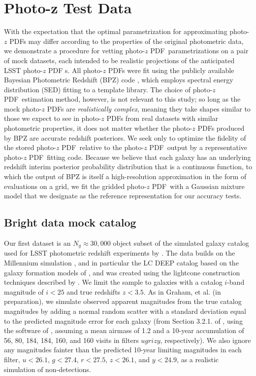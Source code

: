 \documentclass[\docopts]{\docclass}
\newcommand{\pz}{photo-$z$ PDF}
\newcommand{\Mgdata}{Bright\xspace}
\begin{document}
\section{Photo-z Test Data}
\label{sec:data}

With the expectation that the optimal parametrization for approximating \pz s 
may differ according to the properties of the original photometric data, we 
demonstrate a procedure for vetting \pz\ parametrizations on a pair of mock 
datasets, each intended to be realistic projections of the anticipated LSST \pz 
s.
All \pz s were fit using the publicly available Bayesian Photometric Redshift 
(BPZ) code \citep{benitez_bayesian_2000}, which employs spectral energy 
distribution (SED) fitting to a template library.
The choice of \pz\ estimation method, however, is not relevant to this study; 
so long as the mock \pz s are \textit{realistically complex}, meaning they take 
shapes similar to those we expect to see in \pz s from real datasets with 
similar photometric properties, it does not matter whether the \pz s produced 
by BPZ are accurate redshift posteriors.
We seek only to optimize the fidelity of the stored \pz\ relative to the \pz\ 
output by a representative \pz\ fitting code.
\citep[See][Schmidt, et al.\ in preparation for other work comparing the 
accuracy of \pz s produced by different methods.]{tanaka_photometric_2017}
Because we believe that each galaxy has an underlying redshift interim 
posterior probability distribution that is a continuous function, to which the 
output of BPZ is itself a high-resolution approximation in the form of 
evaluations on a grid, we fit the gridded \pz\ with a Gaussian mixture model 
that we designate as the reference representation for our accuracy tests.

\subsection{\Mgdata data mock catalog}
\label{sec:graham}

Our first dataset is an $N_{g}\approx30,000$ object subset of the simulated 
galaxy catalog used for LSST photometric redshift experiments by 
\citet{graham_photometric_2017}.
The data builds on the Millennium simulation \citep{springel_simulations_2005}, 
and in particular the LC DEEP catalog based on the galaxy formation models of 
\citet{gonzalez-perez_how_2014}, and was created using the lightcone 
construction techniques described by \citet{merson_lightcone_2013}.
We limit the sample to galaxies with a catalog $i$-band magnitude of $i<25$ and 
true redshifts $z<3.5$.
As in Graham, et al. (in preparation), we simulate observed apparent magnitudes 
from the true catalog magnitudes by adding a normal random scatter with a 
standard deviation equal to the predicted magnitude error for each galaxy (from 
Section 3.2.1. of \citet{ivezic_lsst:_2008}, using the software of 
\citet{connolly_end--end_2014}, assuming a mean airmass of 1.2 and a 10-year 
accumulation of 56, 80, 184, 184, 160, and 160 visits in filters $ugrizy$, 
respectively).
We also ignore any magnitudes fainter than the predicted 10-year limiting 
magnitudes in each filter, $u<26.1$, $g<27.4$, $r<27.5$, $z<26.1$, and 
$y<24.9$, as a realistic simulation of non-detections.
\end{document}
